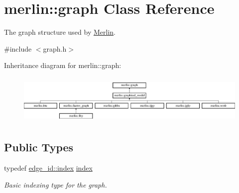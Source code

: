 \hypertarget{classmerlin_1_1graph}{}\section{merlin\+:\+:graph Class Reference}
\label{classmerlin_1_1graph}


The graph structure used by \hyperlink{classMerlin}{Merlin}.  




{\ttfamily \#include $<$graph.\+h$>$}

Inheritance diagram for merlin\+:\+:graph\+:\begin{figure}[H]
\begin{center}
\leavevmode
\includegraphics[height=2.440087cm]{classmerlin_1_1graph}
\end{center}
\end{figure}
\subsection*{Public Types}
\begin{DoxyCompactItemize}
\item 
typedef \hyperlink{structmerlin_1_1edge__id_af57e3c1f2c2c3194d96468a5f0e7cce0}{edge\+\_\+id\+::index} \hyperlink{classmerlin_1_1graph_a5cade38832f47248573e921276f122d6}{index}\hypertarget{classmerlin_1_1graph_a5cade38832f47248573e921276f122d6}{}\label{classmerlin_1_1graph_a5cade38832f47248573e921276f122d6}

\begin{DoxyCompactList}\small\item\em Basic indexing type for the graph. \end{DoxyCompactList}\end{DoxyCompactItemize}
